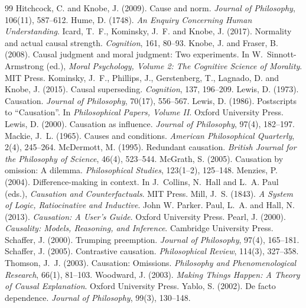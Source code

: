 \documentclass{situationist-preprint}
\begin{document}
\begin{thebibliography}{99}
 Hitchcock, C. and Knobe, J. (2009). Cause and norm. \emph{Journal of Philosophy}, 106(11), 587--612.
 Hume, D. (1748). \emph{An Enquiry Concerning Human Understanding}.
 Icard, T.~F., Kominsky, J.~F. and Knobe, J. (2017). Normality and actual causal strength. \emph{Cognition}, 161, 80--93.
 Knobe, J. and Fraser, B. (2008). Causal judgment and moral judgment: Two experiments. In W.~Sinnott-Armstrong (ed.), \emph{Moral Psychology, Volume 2: The Cognitive Science of Morality}. MIT Press.
 Kominsky, J.~F., Phillips, J., Gerstenberg, T., Lagnado, D. and Knobe, J. (2015). Causal superseding. \emph{Cognition}, 137, 196--209.
 Lewis, D. (1973). Causation. \emph{Journal of Philosophy}, 70(17), 556--567.
 Lewis, D. (1986). Postscripts to \enquote{Causation}. In \emph{Philosophical Papers, Volume II}. Oxford University Press.
 Lewis, D. (2000). Causation as influence. \emph{Journal of Philosophy}, 97(4), 182--197.
 Mackie, J.~L. (1965). Causes and conditions. \emph{American Philosophical Quarterly}, 2(4), 245--264.
 McDermott, M. (1995). Redundant causation. \emph{British Journal for the Philosophy of Science}, 46(4), 523--544.
 McGrath, S. (2005). Causation by omission: A dilemma. \emph{Philosophical Studies}, 123(1--2), 125--148.
 Menzies, P. (2004). Difference-making in context. In J.~Collins, N.~Hall and L.~A. Paul (eds.), \emph{Causation and Counterfactuals}. MIT Press.
 Mill, J.~S. (1843). \emph{A System of Logic, Ratiocinative and Inductive}. John W. Parker.
 Paul, L.~A. and Hall, N. (2013). \emph{Causation: A User's Guide}. Oxford University Press.
 Pearl, J. (2000). \emph{Causality: Models, Reasoning, and Inference}. Cambridge University Press.
 Schaffer, J. (2000). Trumping preemption. \emph{Journal of Philosophy}, 97(4), 165--181.
 Schaffer, J. (2005). Contrastive causation. \emph{Philosophical Review}, 114(3), 327--358.
 Thomson, J.~J. (2003). Causation: Omissions. \emph{Philosophy and Phenomenological Research}, 66(1), 81--103.
 Woodward, J. (2003). \emph{Making Things Happen: A Theory of Causal Explanation}. Oxford University Press.
 Yablo, S. (2002). De facto dependence. \emph{Journal of Philosophy}, 99(3), 130--148.
\end{thebibliography}
\end{document}
